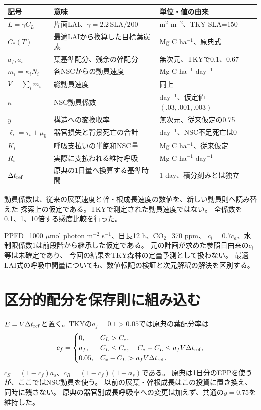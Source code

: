 \documentclass[a4paper,11pt]{ltjsarticle}
\begin{document}
\begin{longtable}{p{27mm}p{65mm}p{47mm}}
\toprule
記号&意味&単位・値の由来\\\midrule
$L=\gamma C_L$&片面LAI、$\gamma=2.2\,\mathrm{SLA}/200$&m$^2$ m$^{-2}$、TKY SLA=150\\
$C_*(T)$&最適LAIから換算した目標葉炭素& Mg C ha$^{-1}$、原典式\\
$a_f,a_s$&葉基準配分、残余の幹配分&無次元、TKYで0.1、0.67\\
$m_i=\kappa_iN_i$&各NSCからの動員速度&Mg C ha$^{-1}$ day$^{-1}$\\
$V=\sum_i m_i$&総動員速度&同上\\
$\kappa$&NSC動員係数&day$^{-1}$、仮定値$(.03,.001,.003)$\\
$y$&構造への変換収率&無次元、従来仮定の0.75\\
$\ell_i=\tau_i+\mu_0$&器官損失と背景死亡の合計&day$^{-1}$、NSC不足死亡は0\\
$K_i$&呼吸支払いの半飽和NSC量&Mg C ha$^{-1}$、従来仮定\\
$R_i$&実際に支払われる維持呼吸&Mg C ha$^{-1}$ day$^{-1}$\\
$\Delta t_{\rm ref}$&原典の1日量へ換算する基準時間&1 day、積分刻みとは独立\\\bottomrule
\end{longtable}
動員係数は、従来の展葉速度と幹・根成長速度の数値を、新しい動員則へ読み替えた
探索上の仮定である。TKYで測定された動員速度ではない。
全係数を0.1、1、10倍する感度比較を行った。

PPFD=1000 $\mu$mol photon m$^{-2}$ s$^{-1}$、日長12 h、CO$_2$=370 ppm、
$c_i=0.7c_a$、水制限係数1は前段階から継承した仮定である。
元の計画が求めた参照日由来の$c_i$等は未確定であり、
今回の結果をTKY森林の定量予測として扱わない。
最適LAI式の呼吸中間量についても、数値転記の検証と次元解釈の解決を区別する。

\section{区分的配分を保存則に組み込む}
$E=V\Delta t_{\rm ref}$と置く。TKYの$a_f=0.1>0.05$では原典の葉配分率は
\begin{equation}
c_f=\begin{cases}
0,&C_L>C_*,\\
a_f,&C_L\le C_*,\quad C_*-C_L\le a_fV\Delta t_{\rm ref},\\
0.05,&C_*-C_L>a_fV\Delta t_{\rm ref}.
\end{cases}
\label{eq:allocation}
\end{equation}
$c_S=(1-c_f)a_s$、$c_R=(1-c_f)(1-a_s)$である。
原典は1日分のEPPを使うが、ここではNSC動員を使う。
以前の展葉・幹根成長はこの投資に置き換え、同時に残さない。
原典の器官別成長呼吸率への変更は加えず、共通の$y=0.75$を維持した。
\end{document}
